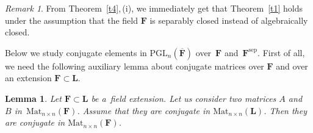 \documentclass{amsart}
\numberwithin{equation}{section}
\theoremstyle{plain}
\newtheorem{lemma}{Lemma}
\theoremstyle{definition}
\theoremstyle{remark}
\newtheorem{remark}{Remark}
\begin{document}
\begin{remark}
\label{r1}
From Theorem~\ref{t4},\,(i), we immediately get that Theorem~\ref{t1} holds under the assumption that the field $\mathbf{F}$ is separably closed instead of algebraically closed.
\end{remark}

Below we study conjugate elements in
$\mathrm{PGL}_n(\overline{\mathbf{F}})$ over~$\mathbf{F}$
and~$\mathbf{F}^{\mathrm{sep}}$. First of all, we need the following
auxiliary lemma about conjugate matrices over $\mathbf{F}$ and over an
extension $\mathbf{F} \subset \mathbf{L}$.

\begin{lemma}
\label{l1}
Let $\mathbf{F} \subset \mathbf{L}$ be a~field extension. Let us consider two matrices $A$ and~$B$  in~$\mathrm{Mat}_{n \times n}(\mathbf{F})$. Assume that they are conjugate in $\mathrm{Mat}_{n \times n}(\mathbf{L})$. Then they are conjugate in $\mathrm{Mat}_{n \times n}(\mathbf{F})$.
\end{lemma}
\end{document}

